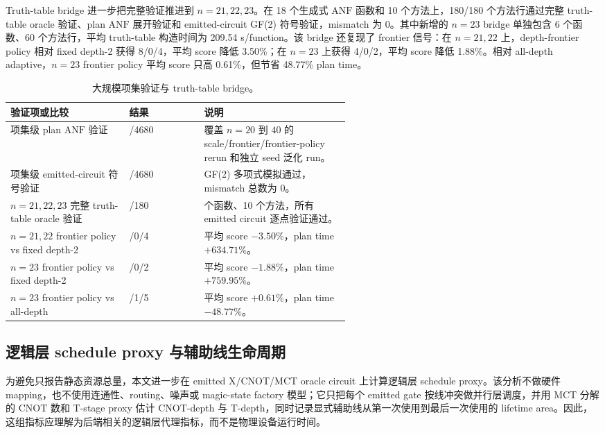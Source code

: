 \documentclass[UTF8,fontset=macnew,11pt]{ctexart}
\newcommand{\anf}{\ensuremath{\mathrm{ANF}}}
\newcommand{\ttable}{truth-table}
\newcommand{\mct}{\ensuremath{\mathrm{MCT}}}
\begin{document}
Truth-table bridge 进一步把完整验证推进到 $n=21,22,23$。在 18 个生成式 \anf{} 函数和 10 个方法上，180/180 个方法行通过完整 \ttable{} oracle 验证、plan \anf{} 展开验证和 emitted-circuit GF(2) 符号验证，mismatch 为 0。其中新增的 $n=23$ bridge 单独包含 6 个函数、60 个方法行，平均 truth-table 构造时间为 209.54 s/function。该 bridge 还复现了 frontier 信号：在 $n=21,22$ 上，depth-frontier policy 相对 fixed depth-2 获得 8/0/4，平均 score 降低 3.50\%；在 $n=23$ 上获得 4/0/2，平均 score 降低 1.88\%。相对 all-depth adaptive，$n=23$ frontier policy 平均 score 只高 0.61\%，但节省 48.77\% plan time。

\begin{table}[H]
\centering
\scriptsize
\caption{大规模项集验证与 truth-table bridge。}
\label{tab:verification}
\begin{tabularx}{\linewidth}{>{\raggedright\arraybackslash}p{0.35\linewidth}>{\raggedright\arraybackslash}p{0.22\linewidth}>{\raggedright\arraybackslash}X}
\toprule
验证项或比较 & 结果 & 说明 \\
\midrule
项集级 plan \anf{} 验证 & 4680/4680 & 覆盖 $n=20$ 到 $40$ 的 scale/frontier/frontier-policy rerun 和独立 seed 泛化 run。 \\
项集级 emitted-circuit 符号验证 & 4680/4680 & GF(2) 多项式模拟通过，mismatch 总数为 0。 \\
$n=21,22,23$ 完整 \ttable{} oracle 验证 & 180/180 & 18 个函数、10 个方法，所有 emitted circuit 逐点验证通过。 \\
$n=21,22$ frontier policy vs fixed depth-2 & 8/0/4 & 平均 score $-3.50\%$，plan time $+634.71\%$。 \\
$n=23$ frontier policy vs fixed depth-2 & 4/0/2 & 平均 score $-1.88\%$，plan time $+759.95\%$。 \\
$n=23$ frontier policy vs all-depth & 0/1/5 & 平均 score $+0.61\%$，plan time $-48.77\%$。 \\
\bottomrule
\end{tabularx}
\end{table}

\subsection{逻辑层 schedule proxy 与辅助线生命周期}

为避免只报告静态资源总量，本文进一步在 emitted X/CNOT/\mct{} oracle circuit 上计算逻辑层 schedule proxy。该分析不做硬件 mapping，也不使用连通性、routing、噪声或 magic-state factory 模型；它只把每个 emitted gate 按线冲突做并行层调度，并用 MCT 分解的 CNOT 数和 T-stage proxy 估计 CNOT-depth 与 T-depth，同时记录显式辅助线从第一次使用到最后一次使用的 lifetime area。因此，这组指标应理解为后端相关的逻辑层代理指标，而不是物理设备运行时间。
\end{document}
